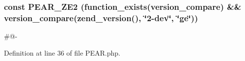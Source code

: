 \hypertarget{PEAR_8php_a16b6fef5a6547779f3d9d6e1b7c5c2b5}{}
\subsubsection[{P\+E\+A\+R\+\_\+\+Z\+E2}]{\setlength{\rightskip}{0pt plus 5cm}const P\+E\+A\+R\+\_\+\+Z\+E2 (function\+\_\+exists(\textquotesingle{}version\+\_\+compare\textquotesingle{}) \&\& version\+\_\+compare(zend\+\_\+version(), \char`\"{}2-\/dev\char`\"{}, \char`\"{}ge\char`\"{}))}\label{PEAR_8php_a16b6fef5a6547779f3d9d6e1b7c5c2b5}
\#@-\/ 

Definition at line 36 of file P\+E\+A\+R.\+php.

